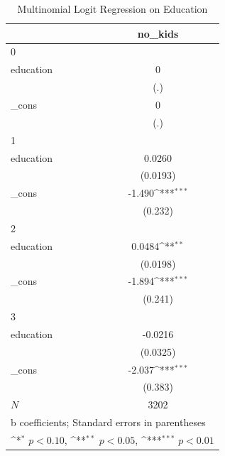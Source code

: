 \begin{table}[htbp]\centering
\def\sym#1{\ifmmode^{#1}\else\(^{#1}\)\fi}
\caption{Multinomial Logit Regression on Education}
\begin{tabular}{l*{1}{c}}
\hline\hline
            &\multicolumn{1}{c}{no\_kids}\\
\hline
0           &                     \\
education   &           0         \\
            &         (.)         \\
[1em]
\_cons      &           0         \\
            &         (.)         \\
\hline
1           &                     \\
education   &      0.0260         \\
            &    (0.0193)         \\
[1em]
\_cons      &      -1.490\sym{***}\\
            &     (0.232)         \\
\hline
2           &                     \\
education   &      0.0484\sym{**} \\
            &    (0.0198)         \\
[1em]
\_cons      &      -1.894\sym{***}\\
            &     (0.241)         \\
\hline
3           &                     \\
education   &     -0.0216         \\
            &    (0.0325)         \\
[1em]
\_cons      &      -2.037\sym{***}\\
            &     (0.383)         \\
\hline
\(N\)       &        3202         \\
\hline\hline
\multicolumn{2}{l}{\footnotesize b coefficients; Standard errors in parentheses}\\
\multicolumn{2}{l}{\footnotesize \sym{*} \(p<0.10\), \sym{**} \(p<0.05\), \sym{***} \(p<0.01\)}\\
\end{tabular}
\end{table}
